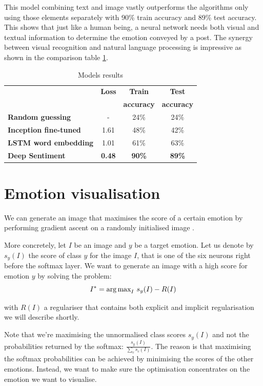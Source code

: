 This model combining text and image vastly outperforms the algorithms only using those elements separately with 90\% train accuracy and 89\% test accuracy. This shows that just like a human being, a neural network needs both visual and textual information to determine the emotion conveyed by a post. The synergy between visual recognition and natural language processing is impressive as shown in the comparison table \ref{all-results}.

\begin{table}[H]
\begin{center}
    \begin{tabular}{| l | c | c | c |}
    \hline
    & \textbf{Loss} & \textbf{Train} & \textbf{Test} \\
    & & \textbf{accuracy} & \textbf{accuracy} \\ \hline
    \textbf{Random guessing} & - & 24\% & 24\% \\ \hline
    \textbf{Inception fine-tuned}  & 1.61 & 48\% & 42\% \\ \hline
    \textbf{LSTM word embedding} & 1.01 & 61\% & 63\% \\ \hline
    \textbf{Deep Sentiment} & \textbf{0.48} & \textbf{90\%} & \textbf{89\%} \\
    \hline
    \end{tabular}
\end{center} 
\caption{Models results}
\label{all-results}
\end{table}

\newpage
\section{Emotion visualisation}
We can generate an image that maximises the score of a certain emotion by performing gradient ascent on a randomly initialised image \cite{class-vis}.

More concretely, let $I$ be an image and $y$ be a target emotion. Let us denote by $s_y(I)$ the score of class $y$ for the image $I$, that is one of the six neurons right before the softmax layer. We want to generate an image with a high score for emotion $y$ by solving the problem:
\begin{equation}
I^* = \text{arg\,max}_I ~s_y(I) - R(I)
\end{equation}

with $R(I)$ a regulariser that contains both explicit and implicit regularisation we will describe shortly.

Note that we're maximising the unnormalised class scores $s_y(I)$ and not the probabilities returned by the softmax: $\frac{s_y(I)}{\sum_c s_c(I)}$. The reason is that maximising the softmax probabilities can be achieved by minimising the scores of the other emotions. Instead, we want to make sure the optimisation concentrates on the emotion we want to visualise. 

